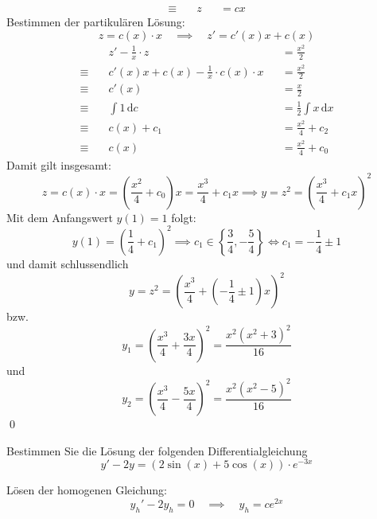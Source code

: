 \documentclass[answers]{exam}
\renewcommand{\d}{\,\mathrm{d}}
\begin{document}
\begin{questions}
\begin{solution}
$$\begin{aligned}
                \equiv \quad & z                        &  & = cx
            \end{aligned}
        $$
        Bestimmen der partikulären Lösung:
        $$
            z = c(x) \cdot x \quad \implies \quad z' = c'(x)x + c(x)
        $$
        $$
            \begin{aligned}
                             & z' - \frac{1}{x} \cdot z                       &  & = \frac{x^2}{2}           \\
                \equiv \quad & c'(x)x + c(x) - \frac{1}{x} \cdot c(x) \cdot x &  & = \frac{x^2}{2}           \\
                \equiv \quad & c'(x)                                          &  & = \frac{x}{2}             \\
                \equiv \quad & \int 1 \d c                                    &  & = \frac{1}{2} \int x \d x \\
                \equiv \quad & c(x) + c_1                                     &  & = \frac{x^2}{4} + c_2     \\
                \equiv \quad & c(x)                                           &  & = \frac{x^2}{4} + c_0
            \end{aligned}
        $$
        \newpage
        Damit gilt insgesamt:
        $$
            z = c(x) \cdot x = \left(\frac{x^2}{4} + c_0\right)x = \frac{x^3}{4} + c_1x \implies y = z^2 = \left(\frac{x^3}{4} + c_1x\right)^2
        $$
        Mit dem Anfangswert $y(1) = 1$ folgt:
        $$
            y(1) = \left(\frac{1}{4} + c_1\right)^2 \implies c_1 \in \left\{\frac{3}{4}, -\frac{5}{4}\right\} \iff c_1 = -\frac{1}{4} \pm 1
        $$
        und damit schlussendlich
        $$
            y = z^2 = \left(\frac{x^3}{4} + \left(-\frac{1}{4} \pm 1\right)x\right)^2
        $$
        bzw.
        $$
            y_1 = \left(\frac{x^3}{4} + \frac{3x}{4}\right)^2 = \frac{x^2\left(x^2 + 3\right)^2}{16}
        $$
        und
        $$
            y_2 = \left(\frac{x^3}{4} - \frac{5x}{4}\right)^2 = \frac{x^2\left(x^2 -5\right)^2}{16}
        $$\qed
    \end{solution}

    \newpage
    \question
    Bestimmen Sie die Lösung der folgenden Differentialgleichung
    $$
        y' - 2y = (2\sin(x) + 5\cos(x)) \cdot e^{-3x}
    $$
    \begin{solution}
        Lösen der homogenen Gleichung:
        $$
            y_h' - 2y_h = 0 \quad \implies \quad y_h = ce^{2x}
        $$


\end{solution}
\end{questions}
\end{document}
